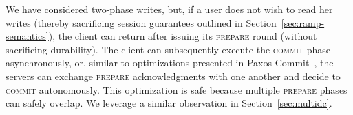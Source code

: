  We have considered two-phase writes, but,
if a user does not wish to read her writes (thereby sacrificing
session guarantees outlined in Section~\ref{sec:ramp-semantics}), the
client can return after issuing its \textsc{prepare} round (without
sacrificing durability). The client can subsequently execute the
\textsc{commit} phase asynchronously, or, similar to optimizations
presented in Paxos Commit~\cite{paxos-commit}, the servers can
exchange \textsc{prepare} acknowledgments with one another and decide
to \textsc{commit} autonomously. This optimization is safe because
multiple \textsc{prepare} phases can safely overlap. We leverage a
similar observation in Section~\ref{sec:multidc}.
